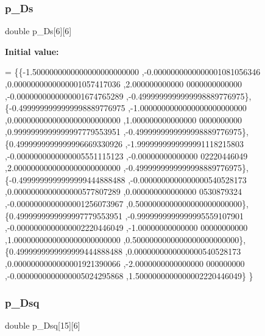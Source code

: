 \mbox{\label{a00449_a75dab8f9530af8120d2bf5350308720e}} 
\subsubsection{\texorpdfstring{p\+\_\+\+Ds}{p\_Ds}}
{\footnotesize\ttfamily double p\+\_\+\+Ds\mbox{[}6\mbox{]}\mbox{[}6\mbox{]}}

{\bfseries Initial value\+:}
\begin{DoxyCode}
= \{\{-1.5000000000000000000000000 ,-0.0000000000000001081056346 ,0.0000000000000001057417036 ,2.000000000000
      0000000000000 ,-0.0000000000000001674765289 ,-0.4999999999999998889776975\},
\{-0.4999999999999998889776975 ,-1.0000000000000000000000000 ,0.0000000000000000000000000 ,1.000000000000000
      0000000000 ,0.9999999999999997779553951 ,-0.4999999999999998889776975\},
\{0.4999999999999996669330926 ,-1.9999999999999991118215803 ,-0.0000000000000005551115123 ,-0.00000000000000
      02220446049 ,2.0000000000000000000000000 ,-0.4999999999999998889776975\},
\{-0.4999999999999999444888488 ,-0.0000000000000000540528173 ,0.0000000000000000577807289 ,0.000000000000000
      0530879324 ,-0.0000000000000001256073967 ,0.5000000000000000000000000\},
\{0.4999999999999997779553951 ,-0.9999999999999995559107901 ,-0.0000000000000002220446049 ,-1.00000000000000
      00000000000 ,1.0000000000000000000000000 ,0.5000000000000000000000000\},
\{0.4999999999999999444888488 ,0.0000000000000000540528173 ,0.0000000000000001921390066 ,-2.0000000000000000
      000000000 ,-0.0000000000000005024295868 ,1.5000000000000002220446049\}
\}
\end{DoxyCode}
\mbox{\label{a00449_a2ce7a35aa2e27f6805f0b623aca12301}} 
\subsubsection{\texorpdfstring{p\+\_\+\+Dsq}{p\_Dsq}}
{\footnotesize\ttfamily double p\+\_\+\+Dsq\mbox{[}15\mbox{]}\mbox{[}6\mbox{]}}

